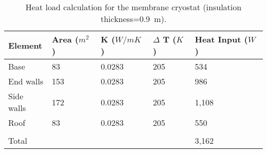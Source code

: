 \begin{table}[htpb]
\centering
\begin{tabular}{|p{}|p{}|p{}|p{}|p{}|}
\hline
 \textbf{Element} & \textbf{Area ($m^2$)}  &  \textbf{K ($W/mK$)} & \textbf{$\Delta$ T ($K$)}
 & \textbf{Heat Input ($W$)}\\ \hline
Base   & 83  & 0.0283   &205   & 534 \\ \hline
End walls  &  153 & 0.0283  &  205 &  986 \\ \hline
Side walls   & 172  & 0.0283  &  205 & 1,108 \\ \hline
Roof  &  83 & 0.0283  & 205  &  550\\ \hline
   &   &   &   &  \\ \hline
Total   &   &   &   & 3,162 \\ \hline
\end{tabular}
\caption{Heat load calculation for the membrane cryostat (insulation thickness=0.9~m). }
\label{tbl:heat-load-calc}
\end{table} 



